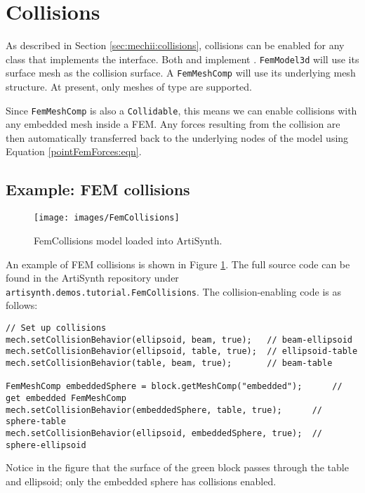 \section{Collisions}
\label{sec:fem:collision}

As described in Section \ref{sec:mechii:collisions}, collisions can be enabled 
for any class that implements the 
 interface.  Both 
 and 
 implement 
.  {\tt FemModel3d}
will use its surface mesh as the collision surface.  A {\tt FemMeshComp} will use
its underlying mesh structure.  At present, only meshes of type 
 are supported.

Since {\tt FemMeshComp} is also a {\tt Collidable}, this means we can enable 
collisions with any embedded mesh inside a FEM.  Any forces resulting from
the collision are then automatically transferred back to the underlying nodes 
of the model using Equation \eqref{pointFemForces:eqn}.

\subsection{Example: FEM collisions}

\begin{figure}[ht]
	\centering
	\texttt{[image: images/FemCollisions]}
	\caption{FemCollisions model loaded into ArtiSynth.}
	\label{fig:fem:collisions}
\end{figure}

An example of FEM collisions is shown in Figure \ref{fig:fem:collisions}.
The full source code can be found in the ArtiSynth repository under
{\tt artisynth.demos.tutorial.FemCollisions}.  The collision-enabling
code is as follows:
\begin{lstlisting}[]
// Set up collisions
mech.setCollisionBehavior(ellipsoid, beam, true);   // beam-ellipsoid
mech.setCollisionBehavior(ellipsoid, table, true);  // ellipsoid-table
mech.setCollisionBehavior(table, beam, true);       // beam-table

FemMeshComp embeddedSphere = block.getMeshComp("embedded");      // get embedded FemMeshComp
mech.setCollisionBehavior(embeddedSphere, table, true);      // sphere-table
mech.setCollisionBehavior(ellipsoid, embeddedSphere, true);  // sphere-ellipsoid   
\end{lstlisting}
Notice in the figure that the surface of the green block passes through
the table and ellipsoid; only the embedded sphere has collisions enabled.

